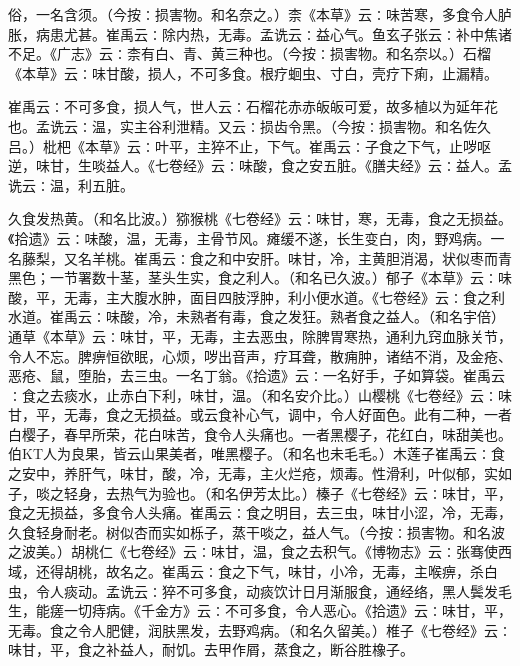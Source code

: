 \documentclass[a4paper,12pt,UTF8,twoside]{ctexbook}
\begin{document}
俗，一名含须。（今按∶损害物。和名奈之。）柰《本草》云∶味苦寒，多食令人胪胀，病患尤甚。崔禹云∶除内热，无毒。孟诜云∶益心气。鱼玄子张云∶补中焦诸不足。《广志》云∶柰有白、青、黄三种也。（今按∶损害物。和名奈以。）石榴《本草》云∶味甘酸，损人，不可多食。根疗蛔虫、寸白，壳疗下痢，止漏精。

崔禹云∶不可多食，损人气，世人云∶石榴花赤赤皈皈可爱，故多植以为延年花也。孟诜云∶温，实主谷利泄精。又云∶损齿令黑。（今按∶损害物。和名佐久吕。）枇杷《本草》云∶叶平，主猝不止，下气。崔禹云∶子食之下气，止哕呕逆，味甘，生啖益人。《七卷经》云∶味酸，食之安五脏。《膳夫经》云∶益人。孟诜云∶温，利五脏。

久食发热黄。（和名比波。）猕猴桃《七卷经》云∶味甘，寒，无毒，食之无损益。《拾遗》云∶味酸，温，无毒，主骨节风。瘫缓不遂，长生变白，肉，野鸡病。一名藤梨，又名羊桃。崔禹云∶食之和中安肝。味甘，冷，主黄胆消渴，状似枣而青黑色；一节署数十茎，茎头生实，食之利人。（和名已久波。）郁子《本草》云∶味酸，平，无毒，主大腹水肿，面目四肢浮肿，利小便水道。《七卷经》云∶食之利水道。崔禹云∶味酸，冷，未熟者有毒，食之发狂。熟者食之益人。（和名宇倍）通草《本草》云∶味甘，平，无毒，主去恶虫，除脾胃寒热，通利九窍血脉关节，令人不忘。脾痹恒欲眠，心烦，哕出音声，疗耳聋，散痈肿，诸结不消，及金疮、恶疮、鼠，堕胎，去三虫。一名丁翁。《拾遗》云∶一名好手，子如算袋。崔禹云∶食之去痰水，止赤白下利，味甘，温。（和名安介比。）山樱桃《七卷经》云∶味甘，平，无毒，食之无损益。或云食补心气，调中，令人好面色。此有二种，一者白樱子，春早所荣，花白味苦，食令人头痛也。一者黑樱子，花红白，味甜美也。伯KT人为良果，皆云山果美者，唯黑樱子。（和名也未毛毛。）木莲子崔禹云∶食之安中，养肝气，味甘，酸，冷，无毒，主火烂疮，烦毒。性滑利，叶似郁，实如子，啖之轻身，去热气为验也。（和名伊芳太比。）榛子《七卷经》云∶味甘，平，食之无损益，多食令人头痛。崔禹云∶食之明目，去三虫，味甘小涩，冷，无毒，久食轻身耐老。树似杏而实如栎子，蒸干啖之，益人气。（今按∶损害物。和名波之波美。）胡桃仁《七卷经》云∶味甘，温，食之去积气。《博物志》云∶张骞使西域，还得胡桃，故名之。崔禹云∶食之下气，味甘，小冷，无毒，主喉痹，杀白虫，令人痰动。孟诜云∶猝不可多食，动痰饮计日月渐服食，通经络，黑人鬓发毛生，能瘥一切痔病。《千金方》云∶不可多食，令人恶心。《拾遗》云∶味甘，平，无毒。食之令人肥健，润肤黑发，去野鸡病。（和名久留美。）椎子《七卷经》云∶味甘，平，食之补益人，耐饥。去甲作屑，蒸食之，断谷胜橡子。
\end{document}
